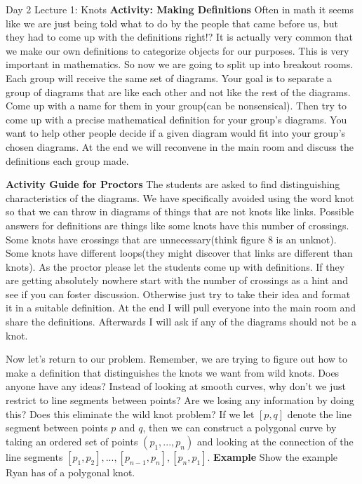 \documentclass{article}
\begin{document}
\begin{section}{Day 2 Lecture 1: Knots}
	 \textbf{Activity: Making Definitions} Often in math it seems like we are just being told what to do by the people that came before us, but they had to come up with the definitions right!? It is actually very common that we make our own definitions to categorize objects for our purposes. This is very important in mathematics. So now we are going to split up into breakout rooms. Each group will receive the same set of diagrams. Your goal is to separate a group of diagrams that are like each other and not like the rest of the diagrams. Come up with a name for them in your group(can be nonsensical). Then try to come up with a precise mathematical definition for your group's diagrams. You want to help other people decide if a given diagram would fit into your group's chosen diagrams. At the end we will reconvene in the main room and discuss the definitions each group made. \medbreak
	 
	 \textbf{Activity Guide for Proctors} The students are asked to find distinguishing characteristics of the diagrams. We have specifically avoided using the word knot so that we can throw in diagrams of things that are not knots like links. Possible answers for definitions are things like some knots have this number of crossings. Some knots have crossings that are unnecessary(think figure 8 is an unknot). Some knots have different loops(they might discover that links are different than knots). As the proctor please let the students come up with definitions. If they are getting absolutely nowhere start with the number of crossings as a hint and see if you can foster discussion. Otherwise just try to take their idea and format it in a suitable definition. At the end I will pull everyone into the main room and share the definitions. Afterwards I will ask if any of the diagrams should not be a knot.
	 
	 Now let's return to our problem. Remember, we are trying to figure out how to make a definition that distinguishes the knots we want from wild knots. Does anyone have any ideas? Instead of looking at smooth curves, why don't we just restrict to line segments between points? Are we losing any information by doing this? Does this eliminate the wild knot problem?  If we let $[p,q]$ denote the line segment between points $p$ and $q$, then we can construct a polygonal curve by taking an ordered set of points $(p_1,...,p_n)$ and looking at the connection of the line segments $[p_1,p_2], ..., [p_{n-1},p_n], [p_n,p_1]$. 
	 \textbf{Example} Show the example Ryan has of a polygonal knot.
	 

\end{section}
\end{document}
